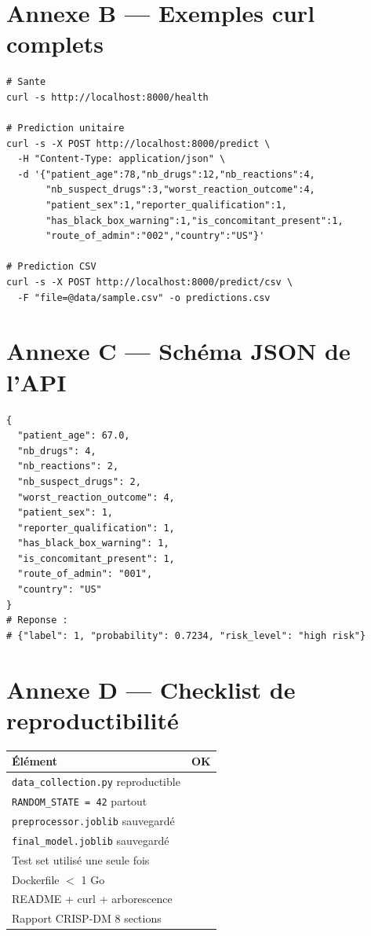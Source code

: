 \documentclass[11pt,a4paper,twoside,openright]{report}
\begin{document}
\chapter{Annexe B — Exemples curl complets}
\begin{lstlisting}[style=bash]
# Sante
curl -s http://localhost:8000/health

# Prediction unitaire
curl -s -X POST http://localhost:8000/predict \
  -H "Content-Type: application/json" \
  -d '{"patient_age":78,"nb_drugs":12,"nb_reactions":4,
       "nb_suspect_drugs":3,"worst_reaction_outcome":4,
       "patient_sex":1,"reporter_qualification":1,
       "has_black_box_warning":1,"is_concomitant_present":1,
       "route_of_admin":"002","country":"US"}'

# Prediction CSV
curl -s -X POST http://localhost:8000/predict/csv \
  -F "file=@data/sample.csv" -o predictions.csv
\end{lstlisting}

\chapter{Annexe C — Schéma JSON de l'API}
\begin{lstlisting}
{
  "patient_age": 67.0,
  "nb_drugs": 4,
  "nb_reactions": 2,
  "nb_suspect_drugs": 2,
  "worst_reaction_outcome": 4,
  "patient_sex": 1,
  "reporter_qualification": 1,
  "has_black_box_warning": 1,
  "is_concomitant_present": 1,
  "route_of_admin": "001",
  "country": "US"
}
# Reponse :
# {"label": 1, "probability": 0.7234, "risk_level": "high risk"}
\end{lstlisting}

\chapter{Annexe D — Checklist de reproductibilité}
\begin{table}[H]
  \centering
  \begin{tabular}{lc}
    \toprule
    \textbf{Élément} & \textbf{OK} \\
    \midrule
    \texttt{data\_collection.py} reproductible & \checkmark \\
    \texttt{RANDOM\_STATE = 42} partout & \checkmark \\
    \texttt{preprocessor.joblib} sauvegardé & \checkmark \\
    \texttt{final\_model.joblib} sauvegardé & \checkmark \\
    Test set utilisé une seule fois & \checkmark \\
    Dockerfile $<$ 1 Go & \checkmark \\
    README + curl + arborescence & \checkmark \\
    Rapport CRISP-DM 8 sections & \checkmark \\
    \bottomrule
  \end{tabular}
\end{table}
\end{document}
